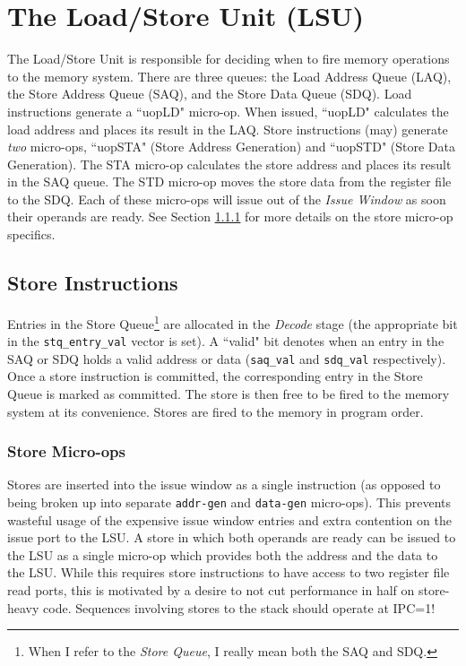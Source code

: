 
\chapter{The Load/Store Unit (LSU)}\label{sec:lsu}

The Load/Store Unit is responsible for deciding when to fire memory operations to the memory system.  There are three queues: the Load Address Queue (LAQ), the Store Address Queue (SAQ), and the Store Data Queue (SDQ).  Load instructions generate a ``uopLD" micro-op.  When issued, ``uopLD" calculates the load address and places its result in the LAQ.  Store instructions (may) generate {\em two} micro-ops,  ``uopSTA" (Store Address Generation) and ``uopSTD" (Store Data Generation).  The STA micro-op calculates the store address and places its result in the SAQ queue.  The STD micro-op moves the store data from the register file to the SDQ.  Each of these micro-ops will issue out of the {\em Issue Window} as soon their operands are ready.  See Section \ref{sec:storeuops} for more details on the store micro-op specifics. 



\section{Store Instructions}

Entries in the Store Queue\footnote{When I refer to the {\em Store Queue}, I really mean both the SAQ and SDQ.} are allocated in the {\em Decode} stage (the appropriate bit in the {\tt stq\_entry\_val} vector is set).  A ``valid" bit denotes when an entry in the SAQ or SDQ holds a valid address or data ({\tt saq\_val} and {\tt sdq\_val} respectively).  Once a store instruction is committed, the corresponding entry in the Store Queue is marked as committed.  The store is then free to be fired to the memory system at its convenience.  Stores are fired to the memory in program order.


\subsection{Store Micro-ops}\label{sec:storeuops}

Stores are inserted into the issue window as a single instruction (as opposed to being broken up into separate {\tt addr-gen} and {\tt data-gen} micro-ops). This prevents wasteful usage of the expensive issue window entries and extra contention on the issue port to the LSU.  A store in which both operands are ready can be issued to the LSU as a single micro-op which provides both the address and the data to the LSU.  While this requires store instructions to have access to two register file read ports, this is motivated by a desire to not cut performance in half on store-heavy code.  Sequences involving stores to the stack should operate at IPC=1!

